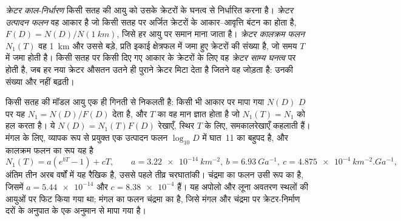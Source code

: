 \begin{definition}\label{def:b3:planetary-interiors-surfaces:crater-dating}
\emph{क्रेटर काल-निर्धारण} किसी सतह की आयु को
उसके क्रेटरों के घनत्व से निर्धारित करना है। \emph{क्रेटर उत्पादन
फलन} वह आकार है जो किसी सतह पर अर्जित क्रेटरों के
आकार--आवृत्ति बंटन का होता है, $F(D) =
N(D)/N(\qty{1}{km})$, जिसे हर आयु पर समान माना जाता है। \emph{क्रेटर
कालक्रम फलन} $N_1(T)$ वह
\qty{1}{km} और उससे बड़े, प्रति इकाई क्षेत्रफल में जमा हुए क्रेटरों की संख्या है, जो
समय $T$ में जमा होती है। किसी सतह पर किसी दिए गए आकार के क्रेटरों के लिए वह \emph{क्रेटर साम्य
घनत्व} पर होती है, जब
हर नया क्रेटर औसतन उतने ही पुराने क्रेटर मिटा देता है जितने वह जोड़ता है:
उनकी संख्या और नहीं बढ़ती।
\end{definition}

किसी सतह की मॉडल आयु एक ही गिनती से निकलती है: किसी भी आकार पर मापा गया $N(D)$
$D$ पर यह $N_1 = N(D)/F(D)$ देता है, और $T$ का वह मान ज्ञात होता है जो $N_1(T) = N_1$ को हल करता है। ये
$N(D) = N_1(T)F(D)$ रेखाएँ, स्थिर $T$ के लिए, समकालरेखाएँ कहलाती हैं। मंगल के लिए, व्यापक रूप से प्रयुक्त एक
उत्पादन फलन $\log_{10}D$ में घात~11 का बहुपद है, और
कालक्रम फलन का रूप यह है
\[
  N_1(T) = a\left(e^{bT} - 1\right) + cT , \qquad
  a = \qty{3.22e-14}{km^{-2}}, \ b = \qty{6.93}{Ga^{-1}}, \
  c = \qty{4.875e-4}{km^{-2}.Ga^{-1}} ,
\]
अंतिम तीन अरब वर्षों में यह रैखिक है, उससे पहले तीव्र चरघातांकी।
चंद्रमा का फलन उसी रूप का है, जिसमें $a = \num{5.44e-14}$ और $c =
\num{8.38e-4}$ हैं। यह अपोलो और लूना अवतरण
स्थलों की आयुओं पर फिट किया गया था; मंगल का फलन चंद्रमा का है, जिसे
मंगल और चंद्रमा पर क्रेटर-निर्माण दरों के अनुपात के एक अनुमान से मापा गया है।

